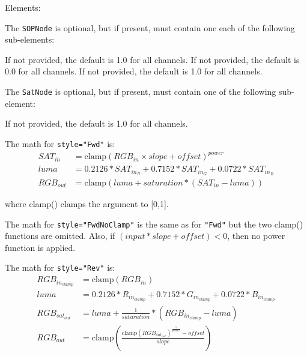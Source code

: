 Elements:
\begin{xmlfields}
	\xmlitem[SOPNode][optional] The \texttt{SOPNode} is optional, but if present, must contain one each of the following sub-elements:
	\begin{xmlfields}
		\xmlitemd[Slope] If not provided, the default is 1.0 for all channels.
		\xmlitemd[Offset] If not provided, the default is 0.0 for all channels.
		\xmlitemd[Power] If not provided, the default is 1.0 for all channels.
	\end{xmlfields}
	\xmlitem[SatNode][optional] The \texttt{SatNode} is optional, but if present, must contain one of the following sub-element:
	\begin{xmlfields}
		\xmlitemd[Saturation] If not provided, the default is 1.0 for all channels.
	\end{xmlfields}
\end{xmlfields}


The math for \texttt{style="Fwd"} is:
	\begin{align*}
		SAT_{in} &= \mathrm{clamp}(RGB_{in} \times slope + offset)^{power} \\
		luma &= 0.2126 * SAT_{in_R} + 0.7152 * SAT_{in_G} + 0.0722 * SAT_{in_B} \\
		RGB_{out} &= \mathrm{clamp}(luma + saturation * (SAT_{in} - luma))
	\end{align*}

where clamp() clamps the argument to [0,1].

The math for \texttt{style="FwdNoClamp"} is the same as for \texttt{"Fwd"} but the two clamp() functions are omitted. Also, if $(input * slope + offset) < 0$, then no power function is applied.

The math for \texttt{style="Rev"} is:
	\begin{align*}
		RGB_{in_{clamp}} &= \mathrm{clamp}(RGB_{in}) \\
		luma &= 0.2126 * R_{in_{clamp}} + 0.7152 * G_{in_{clamp}} + 0.0722 * B_{in_{clamp}} \\
		RGB_{sat_{out}} &= luma + \frac{1}{saturation} * (RGB_{in_{clamp}} - luma) \\
		RGB_{out} &= \mathrm{clamp}\left(\frac{\mathrm{clamp}(RGB_{sat_{out}})^{\frac{1}{power}} - offset}{slope}\right) \\
	\end{align*}

